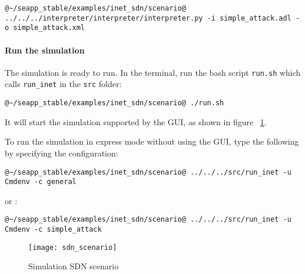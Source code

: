 %
\begin{lstlisting}[language={terminal}]
@~/seapp_stable/examples/inet_sdn/scenario@ ../../../interpreter/interpreter/interpreter.py -i simple_attack.adl -o simple_attack.xml
\end{lstlisting}
% 

\paragraph{Run the simulation}
The simulation is ready to run. In the terminal, run the bash script \texttt{run.sh} which calls \texttt{run\_inet} in the \texttt{src} folder:
%
\begin{lstlisting}[language={terminal}]
@~/seapp_stable/examples/inet_sdn/scenario@ ./run.sh
\end{lstlisting}
%
It will start the simulation supported by the GUI, as shown in figure ~\ref{img:scenario}.

To run the simulation in express mode without using the GUI, type the following by specifying the configuration:
\begin{lstlisting}[language={terminal}]
@~/seapp_stable/examples/inet_sdn/scenario@ ../../../src/run_inet -u Cmdenv -c general
\end{lstlisting}
%

or :
\begin{lstlisting}[language={terminal}]
@~/seapp_stable/examples/inet_sdn/scenario@ ../../../src/run_inet -u Cmdenv -c simple_attack
\end{lstlisting}
%

\begin{landscape}
\begin{figure}[b]
\centering
\texttt{[image: sdn\_scenario]}
\caption{Simulation SDN scenario}
\label{img:scenario}
\end{figure}
\end{landscape}


 






